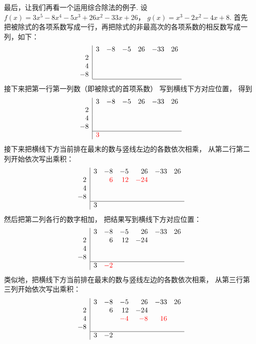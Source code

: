 最后，让我们再看一个运用综合除法的例子.
设\(f(x) = 3x^5 - 8x^4 - 5x^3 + 26x^2 - 33x + 26\)，
\(g(x) = x^3 - 2x^2 - 4x + 8\).
首先把被除式的各项系数写成一行，再把除式的非最高次的各项系数的相反数写成一列，如下：\begin{equation*}
	\begin{array}{r|*6r}
		& 3 & -8 & -5 & 26 & -33 & 26 \\
		2 \\
		4 \\
		-8 \\ \cline{2-7}
	\end{array}
\end{equation*}
接下来把第一行第一列数（即被除式的首项系数）
写到横线下方对应位置，
得到\begin{equation*}
	\begin{array}{r|*6r}
		& 3 & -8 & -5 & 26 & -33 & 26 \\
		2 \\
		4 \\
		-8 \\ \cline{2-7}
		& \color{red}3
	\end{array}
\end{equation*}
接下来把横线下方当前排在最末的数与竖线左边的各数依次相乘，
从第二行第二列开始依次写出乘积：\begin{equation*}
	\begin{array}{r|*6r}
		& 3 & -8 & -5 & 26 & -33 & 26 \\
		2 & & \color{red}6 & \color{red}12 & \color{red}-24 \\
		4 \\
		-8 \\ \cline{2-7}
		& 3
	\end{array}
\end{equation*}
然后把第二列各行的数字相加，
把结果写到横线下方对应位置：\begin{equation*}
	\begin{array}{r|*6r}
		& 3 & -8 & -5 & 26 & -33 & 26 \\
		2 & & 6 & 12 & -24 \\
		4 \\
		-8 \\ \cline{2-7}
		& 3 & \color{red}-2
	\end{array}
\end{equation*}
类似地，把横线下方当前排在最末的数与竖线左边的各数依次相乘，
从第三行第三列开始依次写出乘积：\begin{equation*}
	\begin{array}{r|*6r}
		& 3 & -8 & -5 & 26 & -33 & 26 \\
		2 && 6 & 12 & -24 \\
		4 &&& \color{red}-4 & \color{red}-8 & \color{red}16 \\
		-8 \\ \cline{2-7}
		& 3 & -2
	\end{array}
\end{equation*}
